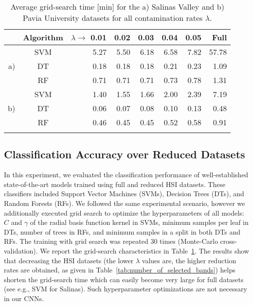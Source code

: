 \documentclass[journal]{IEEEtran}
\newcommand{\ContaminationRate}{\lambda}
\begin{document}
\begin{table}[ht!]
	\scriptsize
	\centering
	\caption{Average grid-search time [min] for the a) Salinas Valley and b) Pavia University datasets for all contamination rates $\ContaminationRate$.}
	\label{tab:grid_search_statistics}
	\renewcommand{\tabcolsep}{0.25cm}
	\begin{tabular}{rcrrrrrr}
		\Xhline{2\arrayrulewidth}
		&Algorithm & $\ContaminationRate\rightarrow$ 0.01 & 0.02 & 0.03 & 0.04 & 0.05 & Full \\
		\hline
		& SVM & 5.27 & 5.50 & 6.18 & 6.58 & 7.82 & 57.78\\
		a) & DT & 0.18 & 0.18 & 0.18 & 0.21 & 0.23 & 1.09 \\
		& RF & 0.71 & 0.71 & 0.71 & 0.73 & 0.78 & 1.31 \\
\hline
		& SVM & 1.40 & 1.55 & 1.66 & 2.00 & 2.39 & 7.19\\
		b) & DT & 0.06 & 0.07 & 0.08 & 0.10 & 0.13 & 0.48 \\
		& RF & 0.46 & 0.45 & 0.45 & 0.52 & 0.58 & 0.91 \\
		\Xhline{2\arrayrulewidth}
	\end{tabular}
\end{table}

\subsection{Classification Accuracy over Reduced Datasets}

In this experiment, we evaluated the classification performance of well-established state-of-the-art models trained using full and reduced HSI datasets. These classifiers included Support Vector Machines (SVMs), Decision Trees (DTs), and Random Forests (RFs). We followed the same experimental scenario, however we additionally executed grid search to optimize the hyperparameters of all models: $C$ and $\gamma$ of the radial basis function kernel in SVMs, minimum samples per leaf in DTs, number of trees in RFs, and minimum samples in a split in both DTs and RFs. The training with grid search was repeated 30 times (Monte-Carlo cross-validation). We report the grid-search characteristics in Table~\ref{tab:grid_search_statistics}. The results show that decreasing the HSI datasets (the lower $\ContaminationRate$ values are, the higher reduction rates are obtained, as given in Table~\ref{tab:number_of_selected_bands}) helps shorten the grid-search time which can easily become very large for full datasets (see e.g., SVM for Salinas). Such hyperparameter optimizations are not necessary in our CNNs.
\end{document}
